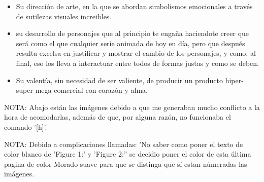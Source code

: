 \documentclass[11pt,a5paper]{article}
\begin{document}
\begin{itemize}
    \item Su dirección de arte, en la que se abordan simbolismos emocionales a través de sutilezas visuales increibles.
    \item su desarrollo de personajes que al principio te engaña haciendote creer que será como el que cualquier serie animada de hoy en día, pero que después resulta excelsa en justificar y mostrar el cambio de los personajes, y como, al final, eso los lleva a interactuar entre todos de formas justas y como se deben.
    \item Su valentía, sin necesidad de ser valiente, de producir un producto hiper-super-mega-comercial con corazón y alma.
\end{itemize}

NOTA: Abajo están las imágenes debido a que me generaban mucho conflicto a la hora de acomodarlas, además de que, por alguna razón, no funcionaba el comando '[h]'.

\newpage

\pagecolor{moradu}

{\tiny{NOTA: Debido a complicaciones llamadas: 'No saber como poner el texto de color blanco de 'Figure 1:' y 'Figure 2:'' se decidio poner el color de esta última pagina de color Morado suave para que se distinga que sí estan númeradas las imágenes.}}\newline
\end{document}
